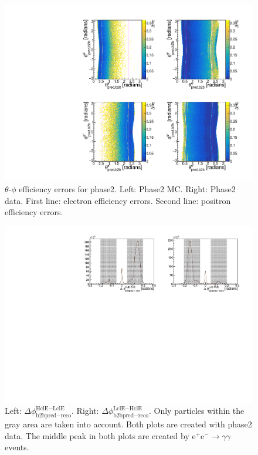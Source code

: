 \documentclass[a4paper,11pt,twosided,final,german,openbib,pdftex,listof=totoc,bibliography=totoc]{scrbook}
\begin{document}
\begin{appendix}
\begin{figure}[!htbp]
	\centering
	\includegraphics[width=\textwidth]{Plots/master/xCEffTP_MCData_Error.pdf}
	\caption[$\theta$-$\phi$ Efficiency Error Plots Phase2]{$\theta$-$\phi$ efficiency errors for phase2. Left: Phase2 MC. Right: Phase2 data. First line: electron efficiency errors. Second line: positron efficiency errors.}
	\label{plt:xCEff_Error}
\end{figure}



\begin{figure}[h!]
	\centering
	\includegraphics[width=\textwidth]{Plots/master/hb2b_Data.pdf}
	\caption[b2bClusterPhi - clusterPhi For Phase2 Data]{Left: $\Delta \phi _{\textrm{b2bpred} - \textrm{reco}}^{\textrm{HclE}-\textrm{LclE}}$. Right:  $\Delta \phi _{\textrm{b2bpred} - \textrm{reco}}^{\textrm{LclE}-\textrm{HclE}}$. Only particles within the gray area are taken into account. Both plots are created with phase2 data. The middle peak in both plots are created by $\textrm{e}^+\textrm{e}^- \rightarrow \gamma \gamma$ events.}
	\label{fig:b2bData2}
\end{figure}




\end{appendix}
\end{document}
